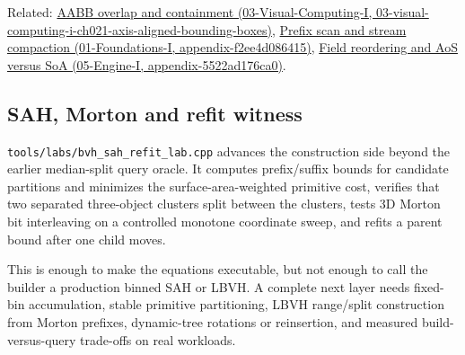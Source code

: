 Related: \href{../03-Visual-Computing-I/main.pdf\#nameddest=03-visual-computing-i-ch021-axis-aligned-bounding-boxes}{AABB overlap and containment (03-Visual-Computing-I, 03-visual-computing-i-ch021-axis-aligned-bounding-boxes)}, \href{../01-Foundations-I/main.pdf\#nameddest=appendix-f2ee4d086415}{Prefix scan and stream compaction (01-Foundations-I, appendix-f2ee4d086415)}, \href{../05-Engine-I/main.pdf\#nameddest=appendix-5522ad176ca0}{Field reordering and AoS versus SoA (05-Engine-I, appendix-5522ad176ca0)}.

\subsection{SAH, Morton and refit witness}\label{appendix-5653a7aea6bb-sah-morton-and-refit-witness}

\texttt{tools/labs/bvh\_sah\_refit\_lab.cpp} advances the construction side beyond the earlier median-split query oracle. It computes prefix/suffix bounds for candidate partitions and minimizes the surface-area-weighted primitive cost, verifies that two separated three-object clusters split between the clusters, tests 3D Morton bit interleaving on a controlled monotone coordinate sweep, and refits a parent bound after one child moves.

This is enough to make the equations executable, but not enough to call the builder a production binned SAH or LBVH. A complete next layer needs fixed-bin accumulation, stable primitive partitioning, LBVH range/split construction from Morton prefixes, dynamic-tree rotations or reinsertion, and measured build-versus-query trade-offs on real workloads.
